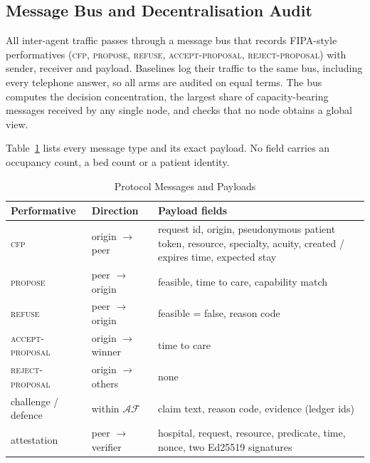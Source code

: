 \subsection{Message Bus and Decentralisation Audit}
All inter-agent traffic passes through a message bus that records FIPA-style performatives (\textsc{cfp}, \textsc{propose}, \textsc{refuse}, \textsc{accept-proposal}, \textsc{reject-proposal}) with sender, receiver and payload. Baselines log their traffic to the same bus, including every telephone answer, so all arms are audited on equal terms. The bus computes the decision concentration, the largest share of capacity-bearing messages received by any single node, and checks that no node obtains a global view.

Table~\ref{tab:messages} lists every message type and its exact payload. No field carries an occupancy count, a bed count or a patient identity.

\begin{table}[!t]
\centering
\caption{Protocol Messages and Payloads}
\label{tab:messages}
\scriptsize
\setlength{\tabcolsep}{2.5pt}
\begin{tabular}{@{}p{1.55cm}p{1.6cm}p{4.35cm}@{}}
\toprule
Performative & Direction & Payload fields \\
\midrule
\textsc{cfp} & origin $\to$ peer & request id, origin, pseudonymous patient token, resource, specialty, acuity, created / expires time, expected stay \\
\textsc{propose} & peer $\to$ origin & feasible, time to care, capability match \\
\textsc{refuse} & peer $\to$ origin & feasible = false, reason code \\
\textsc{accept-proposal} & origin $\to$ winner & time to care \\
\textsc{reject-proposal} & origin $\to$ others & none \\
challenge / defence & within $\mathcal{AF}$ & claim text, reason code, evidence (ledger ids) \\
attestation & peer $\to$ verifier & hospital, request, resource, predicate, time, nonce, two Ed25519 signatures \\
\bottomrule
\end{tabular}
\end{table}

